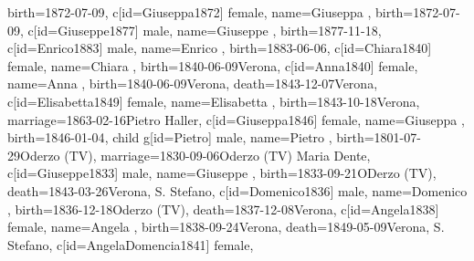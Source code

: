 \documentclass{article}
\begin{document}
\begin{center}
\begin{genealogypicture}
{{{{{                        birth={1872-07-09}{},
                    }
                    c[id=Giuseppa1872]{
                        female,
                        name={Giuseppa },
                        birth={1872-07-09}{},
                    }
                    c[id=Giuseppe1877]{
                        male,
                        name={Giuseppe },
                        birth={1877-11-18}{},
                    }
                    c[id=Enrico1883]{
                        male,
                        name={Enrico },
                        birth={1883-06-06}{},
                    }
                }
                c[id=Chiara1840]{
                    female,
                    name={Chiara },
                    birth={1840-06-09}{Verona},
                }
                c[id=Anna1840]{
                    female,
                    name={Anna },
                    birth={1840-06-09}{Verona},
                    death={1843-12-07}{Verona},
                }
                c[id=Elisabetta1849]{
                    female,
                    name={Elisabetta },
                    birth={1843-10-18}{Verona},
                    marriage={1863-02-16}{Pietro Haller},
                }
                c[id=Giuseppa1846]{
                    female,
                    name={Giuseppa },
                    birth={1846-01-04}{},
                }
            }
            child{
                g[id=Pietro]{
                    male,
                    name={Pietro },
                    birth={1801-07-29}{Oderzo (TV)},
                    marriage={1830-09-06}{Oderzo (TV) \newline Maria Dente},
                }
                c[id=Giuseppe1833]{
                    male,
                    name={Giuseppe },
                    birth={1833-09-21}{ODerzo (TV)},
                    death={1843-03-26}{Verona, S. Stefano},
                }
                c[id=Domenico1836]{
                    male,
                    name={Domenico },
                    birth={1836-12-18}{Oderzo (TV)},
                    death={1837-12-08}{Verona},
                }
                c[id=Angela1838]{
                    female,
                    name={Angela },
                    birth={1838-09-24}{Verona},
                    death={1849-05-09}{Verona, S. Stefano},
                }
                c[id=AngelaDomencia1841]{
                    female,
}}}}
\end{genealogypicture}
\end{center}
\end{document}
